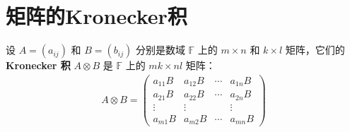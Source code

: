 \documentclass[../../main.tex]{subfiles}%
\begin{document}
\section{矩阵的Kronecker积}

\begin{definition}[矩阵的Kronecker积]
设 $A=(a_{ij})$ 和 $B=(b_{ij})$ 分别是数域 $\mathbb{F}$ 上的 $m\times n$ 和 $k\times l$ 矩阵，它们的 \textbf{Kronecker 积} $A\otimes B$ 是 $\mathbb{F}$ 上的 $mk\times nl$ 矩阵：
\begin{align*}
A\otimes B = 
\begin{pmatrix}
a_{11}B & a_{12}B & \cdots & a_{1n}B \\
a_{21}B & a_{22}B & \cdots & a_{2n}B \\
\vdots & \vdots & & \vdots \\
a_{m1}B & a_{m2}B & \cdots & a_{mn}B
\end{pmatrix}
\end{align*}
\end{definition}
\end{document}
